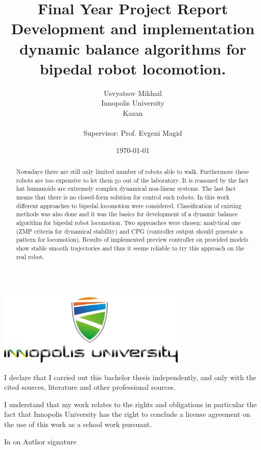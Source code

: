 \documentclass[12pt,a4paper]{report}
\begin{document}
	\title{Final Year Project Report\\ Development and implementation dynamic balance algorithms for bipedal robot locomotion.}
	\author{Usvyatsov Mikhail\\Innopolis University\\Kazan\\  ~\\ \normalsize Supervisor: Prof. Evgeni Magid}
	\date{\normalsize \today}
	\centerline{\mbox{\includegraphics[width=90mm]{iu.jpg}}}
	{\let\newpage\relax\maketitle}
	
		\newpage
		\noindent
		I declare that I carried out this bachelor thesis independently, and only with the cited
		sources, literature and other professional sources.
		
		\medskip\noindent
		I understand that my work relates to the rights and obligations in particular the fact that Innopolis
		University has the right to conclude a license agreement on the use of this
		work as a school work pursuant.
		
		\vspace{18mm}
		\noindent
		In \makebox[4cm]{\dotfill} on \makebox[2.5cm]{\dotfill}
		\hspace*{\fill}
		Author signature
		\hspace*{\fill}
		
	
	\newpage
	
	\tableofcontents
	
	\newpage
	
	\begin{abstract}
		Nowadays there are still only limited number of robots able to walk. Furthermore these robots are too expensive to let them go out of the laboratory. It is reasoned by the fact hat humanoids are extremely complex dynamical non-linear systems. The last fact means that there is no closed-form solution for control such robots. In this work different approaches to bipedal locomotion were considered. Classification of existing methods was also done and it was the basics for development of a dynamic balance algorithm for bipedal robot locomotion. Two approaches were chosen: analytical one (ZMP criteria for dynamical stability) and CPG (controller output should generate a pattern for locomotion). Results of implemented preview controller on provided models show stable smooth trajectories and thus it seems reliable to try this approach on the real robot.
	\end{abstract}
\end{document}
